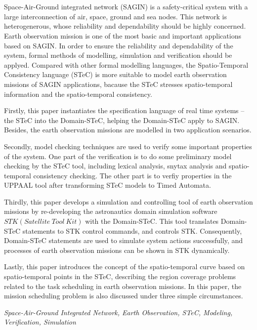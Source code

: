 \newpage
\vspace{-1cm}
\chapter*{}
\vspace{-0.5cm}


Space-Air-Ground integrated network (SAGIN) is a safety-critical system with a large interconnection of air, space, ground and sea nodes. This network is heterogenerous, whose reliability and dependability should be highly concerned. Earth observation mission is one of the most basic and important applications based on SAGIN. In order to ensure the reliability and dependability of the system, formal methods of modelling, simulation and verification should be applyed. Compared with other formal modelling languages, the Spatio-Temporal Consistency language (STeC) is more suitable to model earth observation missions of SAGIN applications, bacause the STeC stresses spatio-temporal information and the spatio-temporal consistency.

Firstly, this paper instantiates the specification language of real time systems -- the STeC into the Domain-STeC, helping the Domain-STeC apply to SAGIN. Besides, the earth observation missions are modelled in two application scenarios.

Secondly, model checking techniques are used to verify some important properties of the system. One part of the verification is to do some preliminary model checking by the STeC tool, including lexical analysis, snytax analysis and spatio-temporal consistency checking. The other part is to verfiy properties in the UPPAAL tool after transforming STeC models to Timed Automata.

Thirdly, this paper develops a simulation and controlling tool of earth observation missions by re-developing the astronautics domain simulation software {$STK(Satellite~Tool~Kit)$} with the Domain-STeC. This tool translates Domain-STeC statements to STK control commands, and controls STK. Consequently, Domain-STeC statements are used to simulate system actions successfully, and processes of earth observation missions can be shown in STK dynamically.

Lastly, this paper introduces the concept of the spatio-temporal curve based on spatio-temporal points in the STeC, describing the region coverage problems related to the task scheduling in earth observation missions. In this paper, the mission scheduling problem is also discussed under three simple circumstances.

\vspace{0.5cm}
{} \textit{Space-Air-Ground Integrated Network, Earth Observation, STeC, Modeling, Verification, Simulation}


































